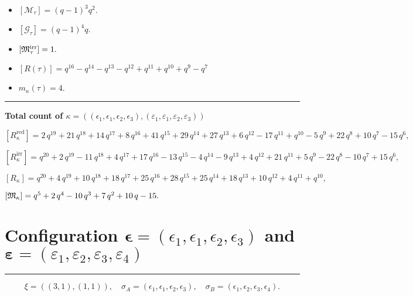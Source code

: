 \documentclass[10pt,a4paper]{amsart}
\begin{document}
\begin{itemize}
 \item $[\mathcal{M}_{\tau}] = {\left(q - 1\right)}^{3} q^{2} .$

 \item $[\mathcal{G}_{\tau}] = {\left(q - 1\right)}^{4} q .$

 \item $[{\frak M}_{\tau}^{\textrm{irr}}] = 1 .$

 \item $[R(\tau)] = q^{16} - q^{14} - q^{13} - q^{12} + q^{11} + q^{10} + q^{9} - q^{7} $

 \item $m_{\kappa}(\tau) = 4 .$

 \end{itemize}
\noindent\rule{9cm}{2pt}\vspace{0.2cm}

\noindent\textbf{Total count of $\kappa = ((\epsilon_1,\epsilon_1,\epsilon_2,\epsilon_3), (\varepsilon_1,\varepsilon_1,\varepsilon_2,\varepsilon_3))$}\medskip

${[R_{\kappa}^{\textrm{red}}]} = 2 \, q^{19} + 21 \, q^{18} + 14 \, q^{17} + 8 \, q^{16} + 41 \, q^{15} + 29 \, q^{14} + 27 \, q^{13} + 6 \, q^{12} - 17 \, q^{11} + q^{10} - 5 \, q^{9} + 22 \, q^{8} + 10 \, q^{7} - 15 \, q^{6} ,$

${[R_{\kappa}^{\textrm{irr}}]} = q^{20} + 2 \, q^{19} - 11 \, q^{18} + 4 \, q^{17} + 17 \, q^{16} - 13 \, q^{15} - 4 \, q^{14} - 9 \, q^{13} + 4 \, q^{12} + 21 \, q^{11} + 5 \, q^{9} - 22 \, q^{8} - 10 \, q^{7} + 15 \, q^{6} ,$

${[R_{\kappa}]} = q^{20} + 4 \, q^{19} + 10 \, q^{18} + 18 \, q^{17} + 25 \, q^{16} + 28 \, q^{15} + 25 \, q^{14} + 18 \, q^{13} + 10 \, q^{12} + 4 \, q^{11} + q^{10} ,$

${[{\frak M}_{\kappa}]} = q^{5} + 2 \, q^{4} - 10 \, q^{3} + 7 \, q^{2} + 10 \, q - 15 .$

\newpage{}

\section{Configuration $\bm{\epsilon} = (\epsilon_1,\epsilon_1,\epsilon_2,\epsilon_3)$ and $\bm{\varepsilon} =(\varepsilon_1,\varepsilon_2,\varepsilon_3,\varepsilon_4)$}
\noindent\rule{8cm}{0.4pt}

$$\xi = ({(3, 1), (1, 1)}),\quad \sigma_A = ({{\epsilon_1, \epsilon_1, \epsilon_2}, {\epsilon_3}}),\quad \sigma_B = ({{\epsilon_1, \epsilon_2, \epsilon_3}, {\epsilon_4}}).$$
\end{document}
